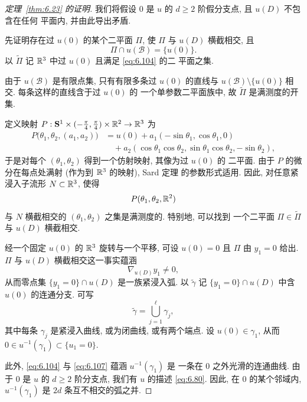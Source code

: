 \begin{proof}[定理~\ref{thm:6.23} 的证明]
我们将假设 $0$ 是 $u$ 的 $d\geq2$ 阶假分支点, 且 $u(D)$ 不包含在任何
平面内, 并由此导出矛盾.

先证明存在过 $u(0)$ 的某个二平面 $\Pi$, 使 $\Pi$ 与 $u(D)$ 横截相交,
且
\begin{equation}
\Pi\cap u(\mathcal{B})=\{u(0)\}.
\label{eq:6.104}
\end{equation}
以 $\tilde{\Pi}$ 记 $\mathbb{R}^3$ 中过 $u(0)$ 且满足 \eqref{eq:6.104} 的二
平面之集.

由于 $u(\mathcal{B})$ 是有限点集, 只有有限多条过 $u(0)$ 的直线与
$u(\mathcal{B})\setminus\{u(0)\}$ 相交. 每条这样的直线含于过 $u(0)$ 的
一个单参数二平面族中, 故 $\tilde{\Pi}$ 是满测度的开集.

定义映射
$P:\mathbf{S}^1\times(-\frac{\pi}{4},\frac{\pi}{4})\times\mathbb{R}^2\to\mathbb{R}^3$ 为
\begin{equation}
\begin{aligned}
P\bigl(\theta_1,\theta_2,(a_1,a_2)\bigr)
&=u(0)+a_1(-\sin\theta_1,\cos\theta_1,0)\\
&\quad+a_2(\cos\theta_1\cos\theta_2,\sin\theta_1\cos\theta_2,
-\sin\theta_2),
\end{aligned}
\label{eq:6.105}
\end{equation}
于是对每个 $(\theta_1,\theta_2)$ 得到一个仿射映射, 其像为过 $u(0)$ 的
二平面. 由于 $P$ 的微分在每点处满射 (作为到 $\mathbb{R}^3$ 的映射), Sard 定理
的参数形式适用. 因此, 对任意紧浸入子流形 $N\subset\mathbb{R}^3$, 使得
\begin{equation}
P(\theta_1,\theta_2,\mathbb{R}^2)
\label{eq:6.106}
\end{equation}
与 $N$ 横截相交的 $(\theta_1,\theta_2)$ 之集是满测度的. 特别地, 可以找到
一个二平面 $\Pi\in\tilde{\Pi}$ 与 $u(D)$ 横截相交.

经一个固定 $u(0)$ 的 $\mathbb{R}^3$ 旋转与一个平移, 可设 $u(0)=0$ 且 $\Pi$ 由
$y_1=0$ 给出. $\Pi$ 与 $u(D)$ 横截相交这一事实蕴涵
\begin{equation}
\nabla_{u(D)}y_1\neq0,
\label{eq:6.107}
\end{equation}
从而零点集 $\{y_1=0\}\cap u(D)$ 是一族紧浸入弧. 以 $\tilde{\gamma}$ 记
$\{y_1=0\}\cap u(D)$ 中含 $u(0)$ 的连通分支. 可写
\begin{equation}
\tilde{\gamma}=\bigcup_{j=1}^{\ell}\gamma_j,
\label{eq:6.108}
\end{equation}
其中每条 $\gamma_j$ 是紧浸入曲线, 或为闭曲线, 或有两个端点. 设
$u(0)\in\gamma_1$, 从而
$0\in u^{-1}(\gamma_1)\subset\{u_1=0\}$.

此外, \eqref{eq:6.104} 与 \eqref{eq:6.107} 蕴涵 $u^{-1}(\gamma_1)$ 是
一条在 $0$ 之外光滑的连通曲线. 由于 $0$ 是 $u$ 的 $d\geq2$ 阶分支点,
我们有 $u$ 的描述 \eqref{eq:6.80}. 因此, 在 $0$ 的某个邻域内,
$u^{-1}(\gamma_1)$ 是 $2d$ 条互不相交的弧之并.


\end{proof}
